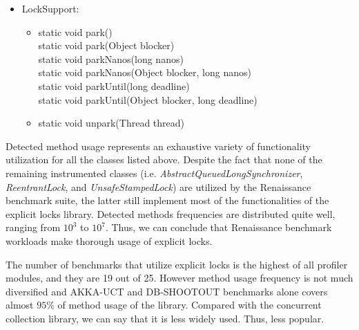 \documentclass[]{usiinfthesis}
\begin{document}
\begin{itemize}
\item LockSupport:
    \begin{itemize}
        \item   static void park()
         \mbox{}\\ static void park(Object blocker)
         \mbox{}\\ static void parkNanos(long nanos)
         \mbox{}\\ static void parkNanos(Object blocker, long nanos)
         \mbox{}\\ static void parkUntil(long deadline)
         \mbox{}\\ static void parkUntil(Object blocker, long deadline)
        \item   static void unpark(Thread thread)
    \end{itemize}
\end{itemize}
 Detected method usage represents an exhaustive variety of functionality utilization for all the classes listed above. Despite the fact that none of the remaining instrumented classes (i.e. \textit{AbstractQueuedLongSynchronizer}, \textit{ReentrantLock}, and \textit{UnsafeStampedLock}) are utilized by the Renaissance benchmark suite, the latter still implement most of the functionalities of the explicit locks library. Detected methods frequencies are distributed quite well, ranging from \(10^3\) to \(10^7\). Thus, we can conclude that Renaissance benchmark workloads make thorough usage of explicit locks.
 
 The number of benchmarks that utilize explicit locks is the highest of all profiler modules, and they are 19 out of 25. However method usage frequency is not much diversified and AKKA-UCT and DB-SHOOTOUT benchmarks alone covers almost \(95\%\) of method usage of the library. Compared with the concurrent collection library, we can say that it is less widely used. Thus, less popular.
 
\end{document}
